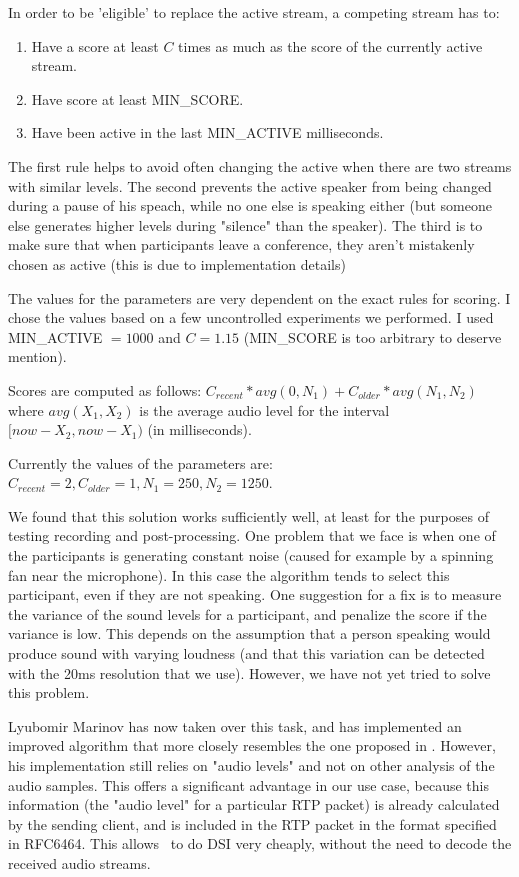 \documentclass[twoside,openright,a4paper,11pt,english]{article}
\begin{document}
In order to be 'eligible' to replace the active stream, a competing stream has to:
\begin{enumerate}
    \item Have a score at least $C$ times as much as the score of the currently active stream.
    \item Have score at least MIN\_SCORE.
    \item Have been active in the last MIN\_ACTIVE milliseconds.
\end{enumerate}

The first rule helps to avoid often changing the active when there are two
streams with similar levels. The second prevents the active speaker from being
changed during a pause of his speach, while no one else is speaking either (but
someone else generates higher levels during "silence" than the speaker). The
third is to make sure that when participants leave a conference, they aren't
mistakenly chosen as active (this is due to implementation details)

The values for the parameters are very dependent on the exact rules for scoring.
I chose the values based on a few uncontrolled experiments we performed. I used
MIN\_ACTIVE $= 1000$ and $C = 1.15$ (MIN\_SCORE is too arbitrary to deserve mention).

Scores are computed as follows: $C_{recent} * avg(0, N_1) + C_{older} * avg(N_1, N_2)$
where $avg(X_1, X_2)$ is the average audio level for the interval $[now-X_2,
now-X_1)$ (in milliseconds). 

Currently the values of the parameters are: $C_{recent} = 2, C_{older} = 1, N_1 = 250, N_2 = 1250$.


\bigskip
We found that this solution works sufficiently well, at least for the purposes
of testing recording and post-processing. One problem that we face is when
one of the participants is generating constant noise (caused for example by a
spinning fan near the microphone). In this case the algorithm tends to select this participant,
even if they are not speaking. One suggestion for a fix is to measure the
variance of the sound levels for a participant, and penalize the score if the
variance is low. This depends on the assumption that a person speaking would
produce sound with varying loudness (and that this variation can be detected
with the 20ms resolution that we use). However, we have not yet tried to solve
this problem.

Lyubomir Marinov has now taken over this task, and has implemented an improved algorithm that more closely resembles the
one proposed in \cite{volfin2012}. However, his implementation still relies on
"audio levels" and not on other analysis of the audio samples. This offers a significant advantage
in our use case, because this information (the "audio level" for a particular RTP packet) is already
calculated by the sending client, and is included in the RTP packet in the format specified in RFC6464\cite{rfc6464}.
This allows \jvb\ to do DSI very cheaply, without the need to decode the received audio streams.
\end{document}
